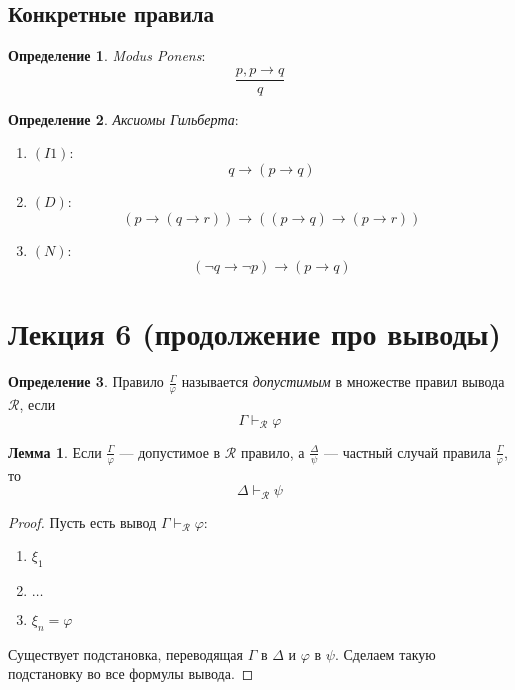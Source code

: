 \documentclass[12pt]{article}
\let\im\rightarrow
\let\n\neg
\theoremstyle{definition}
\newtheorem{definition}{Определение}[section]
\theoremstyle{statement}
\theoremstyle{theorem}
\newtheorem{lemma}{Лемма}[section]
\begin{document}
\subsection{Конкретные правила}

\begin{definition}
  \textit{Modus Ponens}:
  \[
    \frac{p, p \im q}{q}
  \]
\end{definition}

\begin{definition}
  \textit{Аксиомы Гильберта}:
  \begin{enumerate}
    \item $(I1)$:
      \[
        q \im (p \im q)
      \]

    \item $(D)$:
      \[
        (p \im (q \im r)) \im ((p \im q) \im (p \im r))
      \]

    \item $(N)$:
      \[
        (\n q \im \n p) \im (p \im q)
      \]
  \end{enumerate}
\end{definition}

\pagebreak

\section{Лекция 6 (продолжение про выводы)}

\begin{definition}
  Правило $\frac{\Gamma}{\varphi}$ называется \textit{допустимым} в
  множестве правил вывода $\mathcal{R}$, если
  \begin{displaymath}
    \Gamma \vdash_{\mathcal{R}} \varphi
  \end{displaymath}
\end{definition}

\begin{lemma}
  Если $\frac{\Gamma}{\varphi}$ --- допустимое в $\mathcal{R}$
  правило, а $\frac{\Delta}{\psi}$ --- частный случай правила
  $\frac{\Gamma}{\varphi}$, то
  \begin{displaymath}
    \Delta \vdash_{\mathcal{R}} \psi
  \end{displaymath}
  \begin{proof}
    Пусть есть вывод $\Gamma \vdash_{\mathcal{R}} \varphi$:
    \begin{enumerate}
      \item $\xi_1$

      \item $\dots$

      \item $\xi_n = \varphi$
    \end{enumerate}
    Существует подстановка, переводящая $\Gamma$ в $\Delta$ и
    $\varphi$ в $\psi$. Сделаем такую подстановку во все формулы вывода.
  \end{proof}
\end{lemma}
\end{document}
